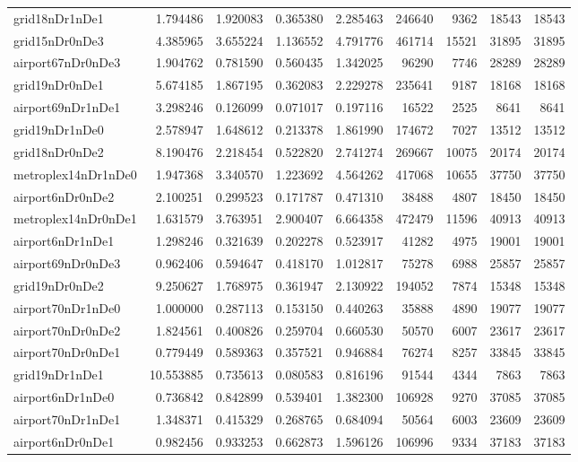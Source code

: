 \documentclass[../../../thesis.tex]{subfiles}
\begin{document}
\begin{longtable}{|l|r|r|r|r|r|r|r|r|}
grid18nDr1nDe1 & 1.794486 & 1.920083 & 0.365380 & 2.285463 & 246640 & 9362 & 18543 & 18543 \\
grid15nDr0nDe3 & 4.385965 & 3.655224 & 1.136552 & 4.791776 & 461714 & 15521 & 31895 & 31895 \\
airport67nDr0nDe3 & 1.904762 & 0.781590 & 0.560435 & 1.342025 & 96290 & 7746 & 28289 & 28289 \\
grid19nDr0nDe1 & 5.674185 & 1.867195 & 0.362083 & 2.229278 & 235641 & 9187 & 18168 & 18168 \\
airport69nDr1nDe1 & 3.298246 & 0.126099 & 0.071017 & 0.197116 & 16522 & 2525 & 8641 & 8641 \\
grid19nDr1nDe0 & 2.578947 & 1.648612 & 0.213378 & 1.861990 & 174672 & 7027 & 13512 & 13512 \\
grid18nDr0nDe2 & 8.190476 & 2.218454 & 0.522820 & 2.741274 & 269667 & 10075 & 20174 & 20174 \\
metroplex14nDr1nDe0 & 1.947368 & 3.340570 & 1.223692 & 4.564262 & 417068 & 10655 & 37750 & 37750 \\
airport6nDr0nDe2 & 2.100251 & 0.299523 & 0.171787 & 0.471310 & 38488 & 4807 & 18450 & 18450 \\
metroplex14nDr0nDe1 & 1.631579 & 3.763951 & 2.900407 & 6.664358 & 472479 & 11596 & 40913 & 40913 \\
airport6nDr1nDe1 & 1.298246 & 0.321639 & 0.202278 & 0.523917 & 41282 & 4975 & 19001 & 19001 \\
airport69nDr0nDe3 & 0.962406 & 0.594647 & 0.418170 & 1.012817 & 75278 & 6988 & 25857 & 25857 \\
grid19nDr0nDe2 & 9.250627 & 1.768975 & 0.361947 & 2.130922 & 194052 & 7874 & 15348 & 15348 \\
airport70nDr1nDe0 & 1.000000 & 0.287113 & 0.153150 & 0.440263 & 35888 & 4890 & 19077 & 19077 \\
airport70nDr0nDe2 & 1.824561 & 0.400826 & 0.259704 & 0.660530 & 50570 & 6007 & 23617 & 23617 \\
airport70nDr0nDe1 & 0.779449 & 0.589363 & 0.357521 & 0.946884 & 76274 & 8257 & 33845 & 33845 \\
grid19nDr1nDe1 & 10.553885 & 0.735613 & 0.080583 & 0.816196 & 91544 & 4344 & 7863 & 7863 \\
airport6nDr1nDe0 & 0.736842 & 0.842899 & 0.539401 & 1.382300 & 106928 & 9270 & 37085 & 37085 \\
airport70nDr1nDe1 & 1.348371 & 0.415329 & 0.268765 & 0.684094 & 50564 & 6003 & 23609 & 23609 \\
airport6nDr0nDe1 & 0.982456 & 0.933253 & 0.662873 & 1.596126 & 106996 & 9334 & 37183 & 37183 \\

\end{longtable}
\end{document}
